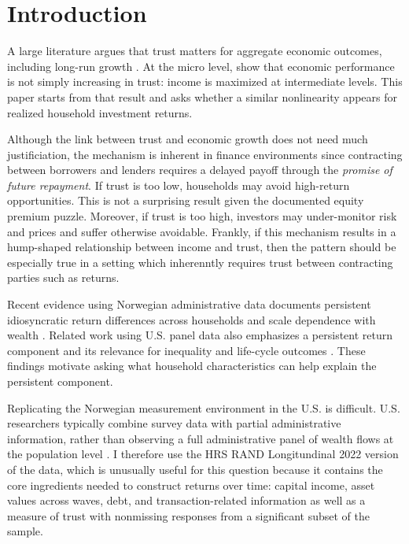 \onlyinsubfile{\setcounter{section}{0}}
\section{Introduction}\notinsubfile{\label{sec:intro}}

\par A large literature argues that trust matters for aggregate economic outcomes, including long-run growth \cite{Algan2010}. At the micro level, \cite{jbpglg2016} show that economic performance is not simply increasing in trust: income is maximized at intermediate levels. This paper starts from that result and asks whether a similar nonlinearity appears for realized household investment returns.

\par Although the link between trust and economic growth does not need much justificiation, the mechanism is inherent in finance environments since contracting between borrowers and lenders requires a delayed payoff through the \textit{promise of future repayment}. If trust is too low, households may avoid high-return opportunities. This is not a surprising result given the documented equity premium puzzle. Moreover, if trust is too high, investors may under-monitor risk and prices and suffer otherwise avoidable. Frankly, if this mechanism results in a hump-shaped relationship between income and trust, then the pattern should be especially true in a setting which inherenntly requires trust between contracting parties such as returns.

\par  Recent evidence using Norwegian administrative data documents persistent idiosyncratic return differences across households and scale dependence with wealth \cite{aflgdmlp20}. Related work using U.S. panel data also emphasizes a persistent return component and its relevance for inequality and life-cycle outcomes \cite{Daminato2024}. These findings motivate asking what household characteristics can help explain the persistent component.

\par Replicating the Norwegian measurement environment in the U.S. is difficult. U.S. researchers typically combine survey data with partial administrative information, rather than observing a full administrative panel of wealth flows at the population level \cite{Kennickell2017b}. I therefore use the HRS RAND Longitundinal 2022 version of the data, which is unusually useful for this question because it contains the core ingredients needed to construct returns over time: capital income, asset values across waves, debt, and transaction-related information as well as a measure of trust with nonmissing responses from a significant subset of the sample.

